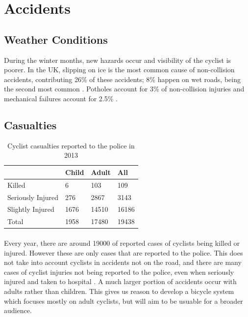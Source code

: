 \documentclass[a4paper]{report}
\begin{document}
{\section{Accidents}
\subsection{Weather Conditions}
During the winter months, new hazards occur and visibility of the cyclist is poorer. In the UK, slipping on ice is the most common cause of non-collision accidents, contributing 26\% of these accidents; 8\% happen on wet roads, being the second most common \citep{winter_safety}. Potholes account for 3\% of non-collision injuries and mechanical failures account for 2.5\% \citep{non-collision_casestudy}.


\subsection{Casualties}
\begin{table}[H]
\begin{tabular}{| l | l | l | l |}
\hline
 & \textbf{Child} & \textbf{Adult} & \textbf{All} \\ \hline
 Killed & 6 & 103 & 109 \\ \hline
 Seriously Injured & 276 & 2867 & 3143 \\ \hline
 Slightly Injured & 1676 & 14510 & 16186 \\ \hline
 Total & 1958 & 17480 & 19438 \\ \hline
\end{tabular}
\caption[Table caption text]{Cyclist casualties reported to the police in 2013 \citep{cycling_accidents}}
\label{table:casualties}
\end{table}

\paragraph{}Every year, there are around 19000 of reported cases of cyclists being killed or injured. However these are only cases that are reported to the police. This does not take into account cyclists in accidents not on the road, and there are many cases of cyclist injuries not being reported to the police, even when seriously injured and taken to hospital \citep{cycling_accidents}.
A much larger portion of accidents occur with adults rather than children. This gives us reason to develop a bicycle system which focuses mostly on adult cyclists, but will aim to be usuable for a broader audience. 
}
\end{document}
